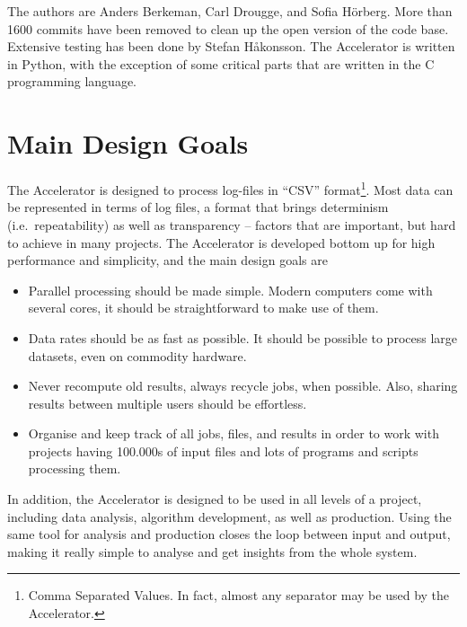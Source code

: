 The authors are Anders Berkeman, Carl Drougge, and Sofia H\"orberg.
More than 1600 commits have been removed to clean up the open version
of the code base.  Extensive testing has been done by Stefan
H{\aa}konsson.  The Accelerator is written in Python, with the
exception of some critical parts that are written in the C programming
language.



\section{Main Design Goals}
The Accelerator is designed to process log-files in ``CSV''
format\footnote{Comma Separated Values.  In fact, almost any separator
may be used by the Accelerator.}.  Most data can be represented in
terms of log files, a format that brings determinism (i.e.\
repeatability) as well as transparency -- factors that are important,
but hard to achieve in many projects.  The Accelerator is developed
bottom up for high performance and simplicity, and the main design
goals are
\begin{itemize}

\item[] Parallel processing should be made simple.  Modern computers
  come with several cores, it should be straightforward to make use of
  them.

\item[] Data rates should be as fast as possible.  It should be
  possible to process large datasets, even on commodity hardware.

\item[] Never recompute old results, always recycle jobs, when
  possible.  Also, sharing results between multiple users should be
  effortless.

\item[] Organise and keep track of all jobs, files, and results in
  order to work with projects having 100.000s of input files and lots
  of programs and scripts processing them.
  
\end{itemize}
In addition, the Accelerator is designed to be used in all levels of a
project, including data analysis, algorithm development, as well as
production.  Using the same tool for analysis and production closes
the loop between input and output, making it really simple to analyse
and get insights from the whole system.




